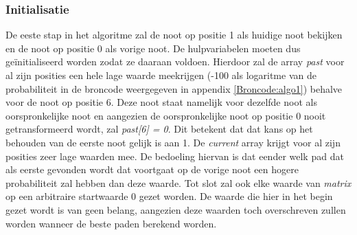 \subsubsection{Initialisatie}
De eeste stap in het algoritme zal de noot op positie 1 als huidige noot bekijken en de noot op positie 0 als vorige noot. De hulpvariabelen moeten dus ge\"initialiseerd worden zodat ze daaraan voldoen. Hierdoor zal de array \textit{past} voor al zijn posities een hele lage waarde meekrijgen (-100 als logaritme van de probabiliteit in de broncode weergegeven in appendix \ref{Broncode:algo1}) behalve voor de noot op positie 6. Deze noot staat namelijk voor dezelfde noot als oorspronkelijke noot en aangezien de oorspronkelijke noot op positie 0 nooit getransformeerd wordt, zal \textit{past[6] = 0}. Dit betekent dat dat kans op het behouden van de eerste noot gelijk is aan 1. De \textit{current} array krijgt voor al zijn posities zeer lage waarden mee. De bedoeling hiervan is dat eender welk pad dat als eerste gevonden wordt dat voortgaat op de vorige noot een hogere probabiliteit zal hebben dan deze waarde. Tot slot zal ook elke waarde van \textit{matrix} op een arbitraire startwaarde 0 gezet worden. De waarde die hier in het begin gezet wordt is van geen belang, aangezien deze waarden toch overschreven zullen worden wanneer de beste paden berekend worden.

